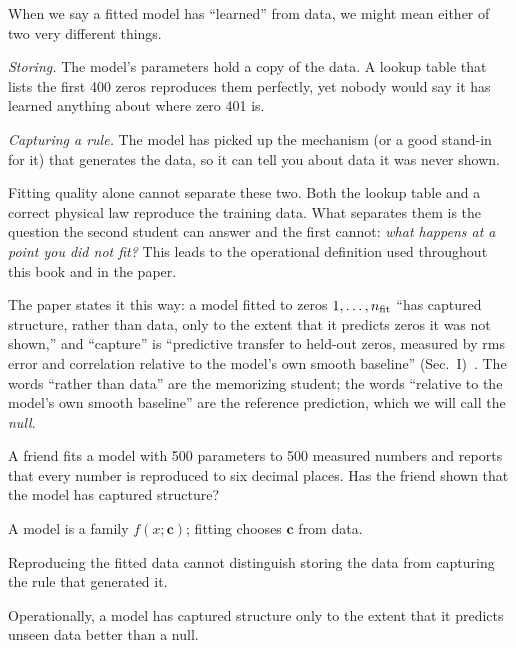 When we say a fitted model has ``learned'' from data, we might mean either of two very different things.

\emph{Storing.} The model's parameters hold a copy of the data. A lookup table that lists the first 400 zeros reproduces them perfectly, yet nobody would say it has learned anything about where zero 401 is.

\emph{Capturing a rule.} The model has picked up the mechanism (or a good stand-in for it) that generates the data, so it can tell you about data it was never shown.

Fitting quality alone cannot separate these two. Both the lookup table and a correct physical law reproduce the training data. What separates them is the question the second student can answer and the first cannot: \emph{what happens at a point you did not fit?} This leads to the operational definition used throughout this book and in the paper.

\begin{center}
\end{center}

The paper states it this way: a model fitted to zeros $1,\dots,n_{\rm fit}$ ``has captured structure, rather than data, only to the extent that it predicts zeros it was not shown,'' and ``capture'' is ``predictive transfer to held-out zeros, measured by rms error and correlation relative to the model's own smooth baseline'' (Sec.~I)~\cite{soniR1}. The words ``rather than data'' are the memorizing student; the words ``relative to the model's own smooth baseline'' are the reference prediction, which we will call the \emph{null}.

\begin{checkpoint}
A friend fits a model with 500 parameters to 500 measured numbers and reports that every number is reproduced to six decimal places. Has the friend shown that the model has captured structure?
\end{checkpoint}

\begin{keyideas}
\item A model is a family $f(x;\bm c)$; fitting chooses $\bm c$ from data.
\item Reproducing the fitted data cannot distinguish storing the data from capturing the rule that generated it.
\item Operationally, a model has captured structure only to the extent that it predicts unseen data better than a null.
\end{keyideas}

